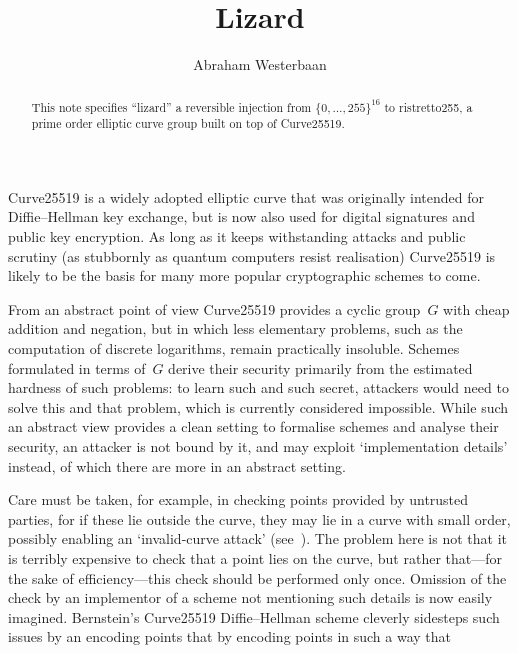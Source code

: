 \documentclass{amsproc}
\title{Lizard}
\author{Abraham Westerbaan}
\begin{document}
\maketitle
\begin{abstract}
This note specifies
``lizard''
a reversible injection from $\{0,\dotsc,255\}^{16}$
to ristretto255, a prime order elliptic curve group built 
    on top of Curve25519.
\end{abstract}

Curve25519 is a widely adopted elliptic curve
that was originally intended\cite{x25519} for 
Diffie--Hellman key exchange,
but is now also used for
digital signatures\cite{ed25519}
and public key encryption\cite{rfc6637}.
As long as it keeps withstanding attacks and public scrutiny
(as stubbornly as quantum computers resist realisation)
Curve25519 is likely to be the basis for many more popular
cryptographic schemes to come.

From an abstract point of view
Curve25519 provides a cyclic group~$G$
with cheap addition and negation,
but in which less elementary problems, 
such as the computation of discrete logarithms,
remain practically insoluble.
Schemes formulated in terms of~$G$
derive their security primarily from 
the estimated hardness of such problems:
to learn such and such secret,
attackers would
need to solve
this and that problem,
which is currently considered impossible.
While such an abstract view
provides a clean setting 
to formalise schemes
and analyse their security,
an attacker is not bound by it,
and may exploit `implementation details' instead,
of which there are more in an abstract setting.

Care must be taken,
for example,
in checking points provided by untrusted parties,
for if these lie outside the curve,
they may lie in a curve with small order,
possibly enabling an `invalid-curve attack'
(see~\cite{invalidcurveattack,hmqvattack}).
The problem here is not that it is terribly expensive
to check that a point lies on the curve,
but rather that---for the sake of efficiency---this check should be 
performed only once. 
Omission of the check by an
implementor
of a scheme not mentioning such details
is now easily imagined.
Bernstein's Curve25519 Diffie--Hellman scheme cleverly sidesteps
such issues
by an encoding points that 
by encoding points in such a way that 
\end{document}
